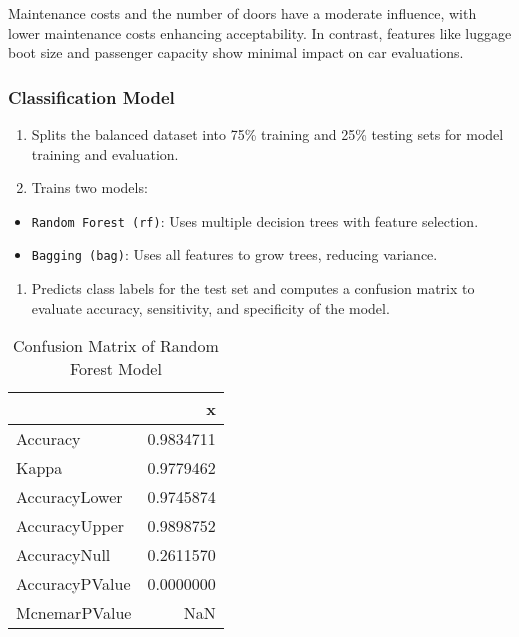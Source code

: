 \documentclass[
  letterpaper,
  DIV=11,
  numbers=noendperiod]{scrartcl}
\providecommand{\tightlist}{%
  \setlength{\itemsep}{0pt}\setlength{\parskip}{0pt}}\usepackage{longtable,booktabs,array}
\begin{document}
Maintenance costs and the number of doors have a moderate influence,
with lower maintenance costs enhancing acceptability. In contrast,
features like luggage boot size and passenger capacity show minimal
impact on car evaluations.

\subsubsection{Classification Model}\label{classification-model}

\begin{enumerate}
\def\labelenumi{\arabic{enumi}.}
\item
  Splits the balanced dataset into 75\% training and 25\% testing sets
  for model training and evaluation.
\item
  Trains two models:
\end{enumerate}

\begin{itemize}
\item
  \texttt{Random\ Forest\ (rf)}: Uses multiple decision trees with
  feature selection.
\item
  \texttt{Bagging\ (bag)}: Uses all features to grow trees, reducing
  variance.
\end{itemize}

\begin{enumerate}
\def\labelenumi{\arabic{enumi}.}
\setcounter{enumi}{2}
\tightlist
\item
  Predicts class labels for the test set and computes a confusion matrix
  to evaluate accuracy, sensitivity, and specificity of the model.
\end{enumerate}

\begin{longtable}[]{@{}lr@{}}

\caption{\label{tbl-overall_confusion_matrix}Confusion Matrix of Random
Forest Model}

\tabularnewline

\toprule\noalign{}
& x \\
\midrule\noalign{}
\endhead
\bottomrule\noalign{}
\endlastfoot
Accuracy & 0.9834711 \\
Kappa & 0.9779462 \\
AccuracyLower & 0.9745874 \\
AccuracyUpper & 0.9898752 \\
AccuracyNull & 0.2611570 \\
AccuracyPValue & 0.0000000 \\
McnemarPValue & NaN \\

\end{longtable}
\end{document}
